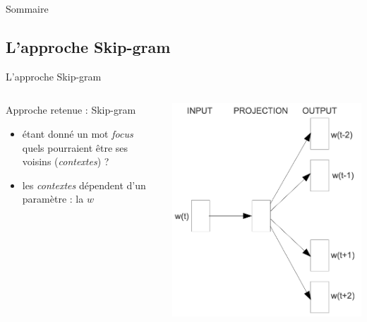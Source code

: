 \documentclass[10pt,xcolor=table,color={dvipsnames,usenames},ignorenonframetext,usepdftitle=false,french]{beamer}
\begin{document}
\begin{frame}{Sommaire}
\protect\hypertarget{sommaire}{}


\end{frame}

\hypertarget{lapproche-skip-gram}{%
\subsection{L’approche Skip-gram}\label{lapproche-skip-gram}}

\begin{frame}{L’approche Skip-gram}
\protect\hypertarget{lapproche-skip-gram-1}{}

\begin{columns}
\begin{column}{0.65\textwidth}
Approche retenue : Skip-gram
\begin{itemize}
\item étant donné un mot \emph{focus} quels pourraient être ses voisins (\emph{contextes}) ?
\item les \emph{contextes} dépendent d'un paramètre : la  $w$
\end{itemize}
\medskip

\medskip {}
\end{column}
\begin{column}{0.4\textwidth} 
\includegraphics[width=\textwidth]{img/skip_gram.png}


\end{column}
\end{columns}
\end{frame}
\end{document}
